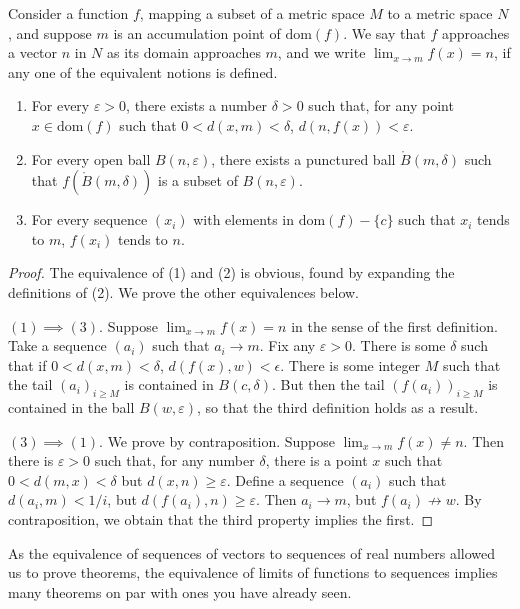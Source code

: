 \begin{definition}
  Consider a function $f$, mapping a subset of a metric space $M$ to a metric space $N$, and suppose $m$ is an accumulation point of $\text{dom}(f)$. We say that $f$ approaches a vector $n$ in $N$ as its domain approaches $m$, and we write $\lim_{x \to m} f(x) = n$, if any one of the equivalent notions is defined.

  \begin{enumerate}
    \item For every $\varepsilon > 0$, there exists a number $\delta > 0$ such that, for any point $x \in \text{dom}(f)$ such that $0 < d(x, m) < \delta$, $d(n, f(x)) < \varepsilon$.
    \item For every open ball $B(n,\varepsilon)$, there exists a punctured ball $\mathring{B}(m,\delta)$ such that $f(\mathring{B}(m,\delta))$ is a subset of $B(n,\varepsilon)$.
    \item For every sequence $(x_i)$ with elements in $\text{dom}(f) - \{ c \}$ such that $x_i$ tends to $m$, $f(x_i)$ tends to $n$.
  \end{enumerate}
\end{definition}
\begin{proof}
  The equivalence of (1) and (2) is obvious, found by expanding the definitions of (2). We prove the other equivalences below.

  $(1) \implies (3)$. Suppose $\lim_{x \to m} f(x) = n$ in the sense of the first definition. Take a sequence $(a_i)$ such that $a_i \to m$. Fix any $\varepsilon > 0$. There is some $\delta$ such that if $0 < d(x, m) < \delta$, $d(f(x), w) < \epsilon$. There is some integer $M$ such that the tail $(a_i)_{i \geq M}$ is contained in $B(c,\delta)$. But then the tail $(f(a_i))_{i \geq M}$ is contained in the ball $B(w,\varepsilon)$, so that the third definition holds as a result.

  $(3) \implies (1)$. We prove by contraposition. Suppose $\lim_{x \to m} f(x) \neq n$. Then there is $\varepsilon > 0$ such that, for any number $\delta$, there is a point $x$ such that $0 < d(m,x) < \delta$ but $d(x,n) \geq \varepsilon$. Define a sequence $(a_i)$ such that $d(a_i, m) < 1/i$, but $d(f(a_i),n) \geq \varepsilon$. Then $a_i \to m$, but $f(a_i) \not \to w$. By contraposition, we obtain that the third property implies the first.
\end{proof}

As the equivalence of sequences of vectors to sequences of real numbers allowed us to prove theorems, the equivalence of limits of functions to sequences implies many theorems on par with ones you have already seen.

